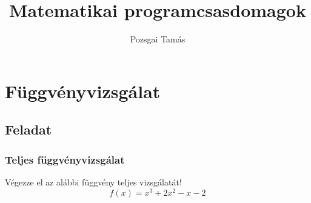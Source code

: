 \documentclass[ignorenonframetext]{beamer}
\title{Matematikai programcsasdomagok}
\author{Pozsgai Tamás}
\institute[Pannon Egyetem]{}
\begin{document}

\frame{\titlepage} %


\frame{
    \tableofcontents
}

\section{Függvényvizsgálat}
\subsection{Feladat}
\begin{frame}[fragile]
    \frametitle{Teljes függvényvizsgálat}
    Végezze el az alábbi függvény teljes vizsgálatát!
    \[
        f(x)=x^3+2x^2-x-2
    \]

\end{frame}
\end{document}
